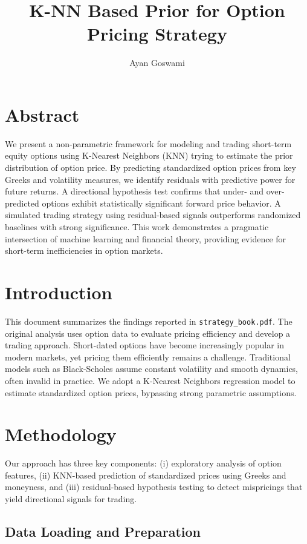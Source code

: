 \documentclass{article}
\title{K-NN Based Prior for Option Pricing Strategy}
\author{Ayan Goswami}
\date{}
\begin{document}
\maketitle
\section{Abstract}

We present a non-parametric framework for modeling and trading short-term equity options using K-Nearest Neighbors (KNN) trying to estimate the prior distribution of option price. By predicting standardized option prices from key Greeks and volatility measures, we identify residuals with predictive power for future returns. A directional hypothesis test confirms that under- and over-predicted options exhibit statistically significant forward price behavior. A simulated trading strategy using residual-based signals outperforms randomized baselines with strong significance. This work demonstrates a pragmatic intersection of machine learning and financial theory, providing evidence for short-term inefficiencies in option markets.

\section{Introduction}

This document summarizes the findings reported in \texttt{strategy\_book.pdf}. The original analysis uses option data to evaluate pricing efficiency and develop a trading approach. Short-dated options have become increasingly popular in modern markets, yet pricing them efficiently remains a challenge. Traditional models such as Black-Scholes assume constant volatility and smooth dynamics, often invalid in practice. We adopt a K-Nearest Neighbors regression model to estimate standardized option prices, bypassing strong parametric assumptions.

\section{Methodology}

Our approach has three key components: (i) exploratory analysis of option features, (ii) KNN-based prediction of standardized prices using Greeks and moneyness, and (iii) residual-based hypothesis testing to detect mispricings that yield directional signals for trading.

\subsection{Data Loading and Preparation}
\end{document}
